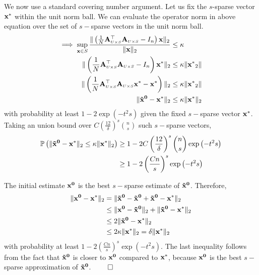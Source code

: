{We now use a standard covering number argument. Let us fix the $s$-sparse vector $\mathbf{x^*}$ within the unit norm ball. We can evaluate the operator norm in above equation over the set of $s-$sparse vectors in the unit norm ball.
\begin{align*}
\implies \sup_{\mathbf{x} \in S} \frac{\|\left(\frac{1}{N} \mathbf{A}_{\scriptscriptstyle{U\times S}}^\top \mathbf{A}_{\scriptscriptstyle{U\times S}} - I_n\right)\mathbf{x}\|_2}{\|\mathbf{x}\|_2} &\leq \kappa \\
\|\left(\frac{1}{N} \mathbf{A}_{\scriptscriptstyle{U\times S}}^\top \mathbf{A}_{\scriptscriptstyle{U\times S}} - I_n\right)\mathbf{x^*}\|_2 &\leq \kappa \|\mathbf{x^*}_2\| \\
 \|\left(\frac{1}{N} \mathbf{A}_{\scriptscriptstyle{U\times S}}^\top \mathbf{A}_{\scriptscriptstyle{U\times S}}\mathbf{x^*} - \mathbf{x^*}\right)\|_2 &\leq \kappa \|\mathbf{x^*}_2\| \\
 \|\mathbf{\tilde{x}^0} - \mathbf{x^*}\|_2 &\leq \kappa \|\mathbf{x^*}\|_2 
\end{align*}
with probability at least $1 - 2\exp\left(-t^2s\right)$ given the fixed $s-$sparse vector $\mathbf{x^*}$. Taking an union bound over $C \left(\frac{12}{\delta}\right)^s \binom{n}{s}$ such $s-$sparse vectors,
\begin{align*}
\mathbb{P}\left(\|\mathbf{\tilde{x}^0} - \mathbf{x^*}\|_2 \leq \kappa \|\mathbf{x^*}\|_2\right) & \geq 1 - 2 C \left(\frac{12}{\delta}\right)^s {n \choose s}\exp\left(-t^2s\right) \\ 
& \geq 1 - 2\left(\frac{Cn}{s}\right)^s\exp\left(-t^2s\right)
\end{align*}

The initial estimate $\mathbf{x^0}$ is the best $s-$sparse estimate of $\mathbf{\tilde{x}^0}$. Therefore,
\begin{align*}
\|\mathbf{{x}^0} - \mathbf{x^*}\|_2 &=  \|\mathbf{\tilde{x}^0} -\mathbf{\tilde{x}^0} +\mathbf{\tilde{x}^0} - \mathbf{x^*}\|_2 \\
& \leq \|\mathbf{{x}^0} -\mathbf{\tilde{x}^0}\|_2 +  \|\mathbf{\tilde{x}^0} - \mathbf{x^*}\|_2 \\
& \leq 2 \|\mathbf{\tilde{x}^0} - \mathbf{x^*}\|_2 \\
& \leq 2 \kappa \|\mathbf{x^*}\|_2 = \delta \|\mathbf{x^*}\|_2
\end{align*}
with probability at least $1 - 2\left(\frac{Cn}{s}\right)^s\exp\left(-t^2s\right)$.
The last inequality follows from the fact that $\mathbf{\tilde{x}^0}$ is closer to $\mathbf{x^0}$ compared to $\mathbf{x^*}$, because $\mathbf{x^0}$ is the best $s-$sparse approximation of $\mathbf{\tilde{x}^0}$. $\qed$}

